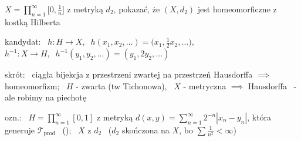 \documentclass[a4paper,12pt]{article}
\begin{document}
\newpage
{} \; \(X = \prod_{n=1}^{\infty} \big[0, \frac{1}{n}\big]\) z metryką \(d_2\), \; pokazać, że \((X, d_2)\) jest homeomorficzne z kostką Hilberta

\smallskip
kandydat: \, \(h: H \to X, \;\; h(x_1, x_2, \dots) = \big(x_1, \frac{1}{2} x_2, \dots\big)\), \; \(h^{-1}: X \to H, \;\; h^{-1}(y_1, y_2, \dots) = (y_1, 2y_2, \dots)\)

\smallskip
skrót: \, ciągła bijekcja z przestrzeni zwartej na przestrzeń Hausdorffa \(\implies\) homeomorfizm; \, \(H\) - zwarta (tw Tichonowa), \, \(X\) - metryczna \(\implies\) Hausdorffa \, - ale robimy na piechotę

\smallskip
ozn.: \, \(H = \prod_{n=1}^{\infty} [0, 1]\) z metryką \(d(x, y) = \sum_{n=1}^{\infty} 2^{-n} |x_n - y_n|\), która generuje \(\mathcal{T}_{\text{prod}}\) \, (); \, \(X\) z \(d_2\) \, (\(d_2\) skończona na \(X\), bo \(\sum \frac{1}{n^2} < \infty\))
\end{document}
